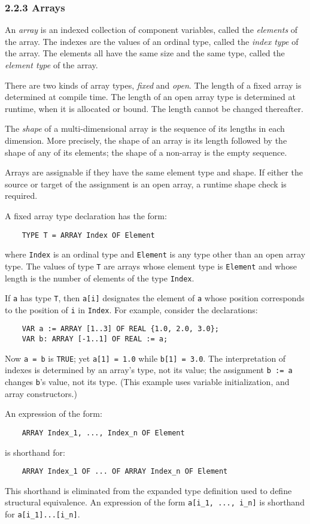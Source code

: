 \documentclass[10pt]{article}
\begin{document}
\subsubsection*{2.2.3 Arrays}

An \emph{array} is an indexed collection of component variables, called the
\emph{elements} of the array.  The indexes are the values of an ordinal type,
called the \emph{index type} of the array.  The elements all have the same
size and the same type, called the \emph{element type} of the array.

There are two kinds of array types, \emph{fixed} and \emph{open}.  The length
of a fixed array is determined at compile time.  The length of an open array
type is determined at runtime, when it is allocated or bound.  The length
cannot be changed thereafter.

The \emph{shape} of a multi-dimensional array is the sequence of its lengths
in each dimension.  More precisely, the shape of an array is its length
followed by the shape of any of its elements; the shape of a non-array is the
empty sequence.

Arrays are assignable if they have the same element type and shape.  If either
the source or target of the assignment is an open array, a runtime shape check
is required.

A fixed array type declaration has the form:
\begin{verbatim}
    TYPE T = ARRAY Index OF Element
\end{verbatim}
where \verb|Index| is an ordinal type and \verb|Element| is any type other
than an open array type.  The values of type \verb|T| are arrays whose element
type is \verb|Element| and whose length is the number of elements of the type
\verb|Index|.

If \verb|a| has type \verb|T|, then \verb|a[i]| designates the element of
\verb|a| whose position corresponds to the position of \verb|i| in
\verb|Index|.  For example, consider the declarations:
\begin{verbatim}
    VAR a := ARRAY [1..3] OF REAL {1.0, 2.0, 3.0};
    VAR b: ARRAY [-1..1] OF REAL := a;
\end{verbatim}
Now \verb|a = b| is \verb|TRUE|; yet \verb|a[1] = 1.0| while
\verb|b[1] = 3.0|.  The interpretation of indexes is determined by an array's
type, not its value; the assignment \verb|b := a| changes \verb|b|'s value,
not its type.  (This example uses variable initialization, and array
constructors.)

An expression of the form:
\begin{verbatim}
    ARRAY Index_1, ..., Index_n OF Element
\end{verbatim}
is shorthand for:
\begin{verbatim}
    ARRAY Index_1 OF ... OF ARRAY Index_n OF Element
\end{verbatim}
This shorthand is eliminated from the expanded type definition used to define
structural equivalence.  An expression of the form \verb|a[i_1, ..., i_n]| is
shorthand for \verb|a[i_1]...[i_n]|.
\end{document}
